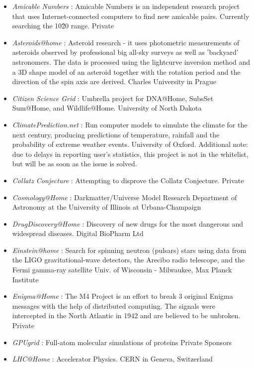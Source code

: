 \begin{itemize}
	\item {\em Amicable Numbers} : Amicable Numbers is an independent research project that uses Internet-connected computers to find new amicable pairs. Currently searching the 10\^20 range.	Private	
	\item {\em Asteroids@home} : Asteroid research - it uses photometric measurements of asteroids observed by professional big all-sky surveys as well as 'backyard' astronomers. The data is processed using the lightcurve inversion method and a 3D shape model of an asteroid together with the rotation period and the direction of the spin axis are derived.	Charles University in Prague
	
	\item {\em Citizen Science Grid} : Umbrella project for DNA@Home, SubsSet Sum@Home, and Wildlife@Home. University of North Dakota
	\item {\em ClimatePrediction.net} : Run computer models to simulate the climate for the next century, producing predictions of temperature, rainfall and the probability of extreme weather events. 	University of Oxford. Additional note: due to delays in reporting user's statistics, this project is not in the whitelist, but will be as soon as the issue is solved.
	\item {\em Collatz Conjecture} : Attempting to disprove the Collatz Conjecture.	Private		
	\item {\em Cosmology@Home} : Darkmatter/Universe Model Research	Department of Astronomy at the University of Illinois at Urbana-Champaign
	\item {\em DrugDiscovery@Home} : Discovery of new drugs for the most dangerous and widespread diseases.	Digital BioPharm Ltd
	\item {\em Einstein@home} : Search for spinning neutron (pulsars) stars using data from the LIGO gravitational-wave detectors, the Arecibo radio telescope, and the Fermi gamma-ray satellite	Univ. of Wisconsin - Milwaukee, Max Planck Institute
	\item {\em Enigma@Home} : The M4 Project is an effort to break 3 original Enigma messages with the help of distributed computing. The signals were intercepted in the North Atlantic in 1942 and are believed to be unbroken.	Private	
	\item {\em GPUgrid} : Full-atom molecular simulations of proteins	Private Sponsors
	\item {\em LHC@Home} : Accelerator Physics. CERN in Geneva, Switzerland

\end{itemize}
